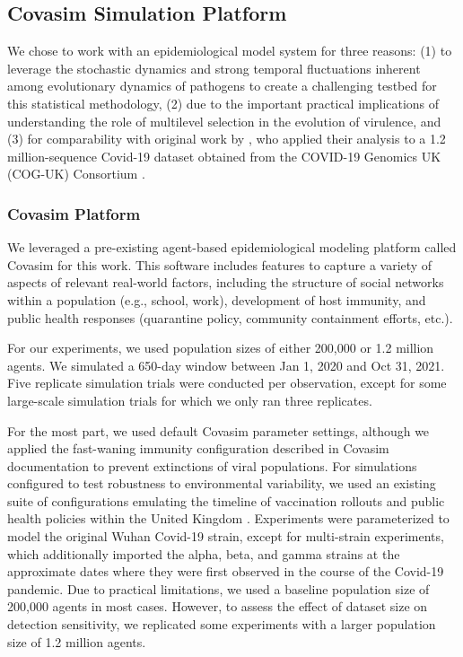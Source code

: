 \subsection{Covasim Simulation Platform}



We chose to work with an epidemiological model system for three reasons: (1) to leverage the stochastic dynamics and strong temporal fluctuations inherent among evolutionary dynamics of pathogens to create a challenging testbed for this statistical methodology, (2) due to the important practical implications of understanding the role of multilevel selection in the evolution of virulence, and (3) for comparability with original work by \citet{BonettiFranceschi2024phylogenetic}, who applied their analysis to a 1.2 million-sequence Covid-19 dataset obtained from the COVID-19 Genomics UK (COG-UK) Consortium \citep{marjanovic2022covid}.

\subsubsection{Covasim Platform}

We leveraged a pre-existing agent-based epidemiological modeling platform called Covasim for this work.
This software includes features to capture a variety of aspects of relevant real-world factors, including the structure of social networks within a population (e.g., school, work), development of host immunity, and public health responses (quarantine policy, community containment efforts, etc.).

For our experiments, we used population sizes of either 200,000 or 1.2 million agents.
We simulated a 650-day window between Jan 1, 2020 and Oct 31, 2021.
Five replicate simulation trials were conducted per observation, except for some large-scale simulation trials for which we only ran three replicates.

For the most part, we used default Covasim parameter settings, although we applied the fast-waning immunity configuration described in Covasim documentation to prevent extinctions of viral populations.
For simulations configured to test robustness to environmental variability, we used an existing suite of configurations emulating the timeline of vaccination rollouts and public health policies within the United Kingdom \citep{Panovska2025Covid19Analysis}.
Experiments were parameterized to model the original Wuhan Covid-19 strain, except for multi-strain experiments, which additionally imported the alpha, beta, and gamma strains at the approximate dates where they were first observed in the course of the Covid-19 pandemic.
Due to practical limitations, we used a baseline population size of 200,000 agents in most cases.
However, to assess the effect of dataset size on detection sensitivity, we replicated some experiments with a larger population size of 1.2 million agents.

